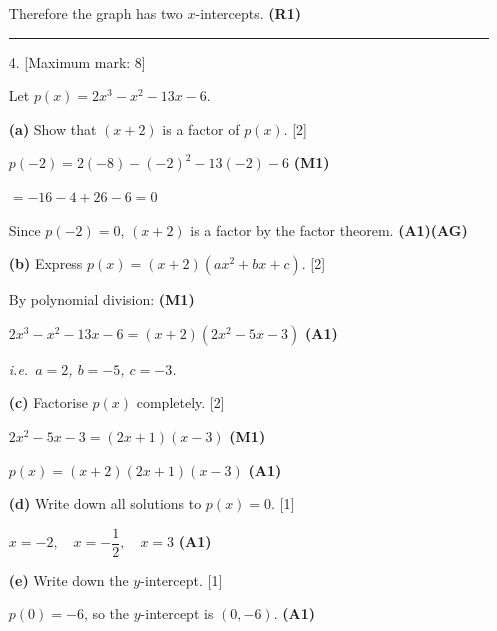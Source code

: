 \documentclass[12pt, twoside]{article}
\begin{document}
\begin{enumerate}[itemsep=0.3cm]
Therefore the graph has two $x$-intercepts. \hfill \textbf{(R1)}

\bigskip
\hrule
\bigskip

\item[4.] [Maximum mark: 8]

Let $p(x) = 2x^3 - x^2 - 13x - 6$.

\medskip

\textbf{(a)} Show that $(x + 2)$ is a factor of $p(x)$. \hfill [2]

$p(-2) = 2(-8) - (-2)^2 - 13(-2) - 6$ \hfill \textbf{(M1)}

$= -16 - 4 + 26 - 6 = 0$

Since $p(-2) = 0$, $(x + 2)$ is a factor by the
factor theorem. \hfill \textbf{(A1)(AG)}

\medskip

\textbf{(b)} Express $p(x) = (x + 2)(ax^2 + bx + c)$. \hfill [2]

By polynomial division: \hfill \textbf{(M1)}

$2x^3 - x^2 - 13x - 6 = (x + 2)(2x^2 - 5x - 3)$ \hfill \textbf{(A1)}

\emph{i.e.\ $a = 2$, $b = -5$, $c = -3$.}

\medskip

\textbf{(c)} Factorise $p(x)$ completely. \hfill [2]

$2x^2 - 5x - 3 = (2x + 1)(x - 3)$ \hfill \textbf{(M1)}

$p(x) = (x + 2)(2x + 1)(x - 3)$ \hfill \textbf{(A1)}

\medskip

\textbf{(d)} Write down all solutions to $p(x) = 0$. \hfill [1]

$x = -2, \quad x = -\dfrac{1}{2}, \quad x = 3$ \hfill \textbf{(A1)}

\medskip

\textbf{(e)} Write down the $y$-intercept. \hfill [1]

$p(0) = -6$, so the $y$-intercept is $(0, -6)$. \hfill \textbf{(A1)}

\end{enumerate}
\end{document}
